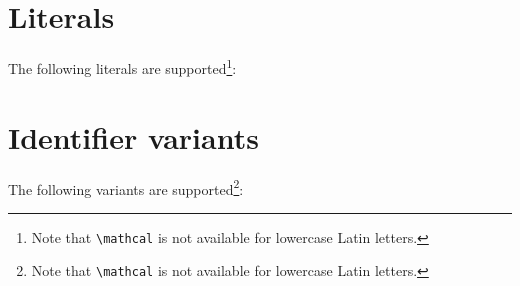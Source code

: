 \documentclass[a4paper,12pt]{article}
\begin{document}
\section{Literals}
The following literals are supported\footnote{Note that \texttt{\textbackslash mathcal} is not available for lowercase Latin letters.}:


\section{Identifier variants}
The following variants are supported\footnote{Note that \texttt{\textbackslash mathcal} is not available for lowercase Latin letters.}:


\end{document}
